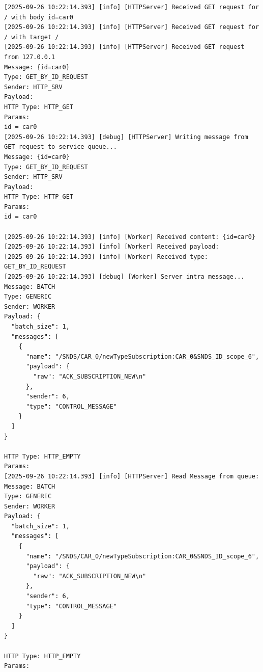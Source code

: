 \documentclass{article}
\begin{document}
\begin{lstlisting}[language=log, caption={G performs the request to retrieve ex A's data, which are now provided through E}, label={lst:g-get-data-from-e}]
[2025-09-26 10:22:14.393] [info] [HTTPServer] Received GET request for / with body id=car0
[2025-09-26 10:22:14.393] [info] [HTTPServer] Received GET request for / with target /
[2025-09-26 10:22:14.393] [info] [HTTPServer] Received GET request from 127.0.0.1
Message: {id=car0}
Type: GET_BY_ID_REQUEST
Sender: HTTP_SRV
Payload: 
HTTP Type: HTTP_GET
Params:
id = car0
[2025-09-26 10:22:14.393] [debug] [HTTPServer] Writing message from GET request to service queue...
Message: {id=car0}
Type: GET_BY_ID_REQUEST
Sender: HTTP_SRV
Payload: 
HTTP Type: HTTP_GET
Params:
id = car0

[2025-09-26 10:22:14.393] [info] [Worker] Received content: {id=car0}
[2025-09-26 10:22:14.393] [info] [Worker] Received payload: 
[2025-09-26 10:22:14.393] [info] [Worker] Received type: GET_BY_ID_REQUEST
[2025-09-26 10:22:14.393] [debug] [Worker] Server intra message...
Message: BATCH
Type: GENERIC
Sender: WORKER
Payload: {
  "batch_size": 1,
  "messages": [
    {
      "name": "/SNDS/CAR_0/newTypeSubscription:CAR_0&SNDS_ID_scope_6",
      "payload": {
        "raw": "ACK_SUBSCRIPTION_NEW\n"
      },
      "sender": 6,
      "type": "CONTROL_MESSAGE"
    }
  ]
}

HTTP Type: HTTP_EMPTY
Params:
[2025-09-26 10:22:14.393] [info] [HTTPServer] Read Message from queue:
Message: BATCH
Type: GENERIC
Sender: WORKER
Payload: {
  "batch_size": 1,
  "messages": [
    {
      "name": "/SNDS/CAR_0/newTypeSubscription:CAR_0&SNDS_ID_scope_6",
      "payload": {
        "raw": "ACK_SUBSCRIPTION_NEW\n"
      },
      "sender": 6,
      "type": "CONTROL_MESSAGE"
    }
  ]
}

HTTP Type: HTTP_EMPTY
Params:


\end{lstlisting}
\end{document}
